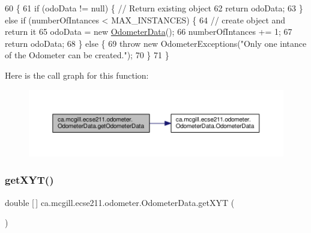 \begin{DoxyCode}
60                                                                                       \{
61     \textcolor{keywordflow}{if} (odoData != null) \{ \textcolor{comment}{// Return existing object}
62       \textcolor{keywordflow}{return} odoData;
63     \} \textcolor{keywordflow}{else} \textcolor{keywordflow}{if} (numberOfIntances < MAX\_INSTANCES) \{
64       \textcolor{comment}{// create object and return it}
65       odoData = \textcolor{keyword}{new} \hyperlink{classca_1_1mcgill_1_1ecse211_1_1odometer_1_1_odometer_data_a91412854b75c41bf3af7c8892ec0fe87}{OdometerData}();
66       numberOfIntances += 1;
67       \textcolor{keywordflow}{return} odoData;
68     \} \textcolor{keywordflow}{else} \{
69       \textcolor{keywordflow}{throw} \textcolor{keyword}{new} OdometerExceptions(\textcolor{stringliteral}{"Only one intance of the Odometer can be created."});
70     \}
71   \}
\end{DoxyCode}
Here is the call graph for this function\+:\nopagebreak
\begin{figure}[H]
\begin{center}
\leavevmode
\includegraphics[width=350pt]{classca_1_1mcgill_1_1ecse211_1_1odometer_1_1_odometer_data_afff2d760dd1f861b580f3eacef37f1cc_cgraph}
\end{center}
\end{figure}
\mbox{\label{classca_1_1mcgill_1_1ecse211_1_1odometer_1_1_odometer_data_a8f40f0264c68f0cbed4fff1723ae7863}} 
\subsubsection{\texorpdfstring{get\+X\+Y\+T()}{getXYT()}}
{\footnotesize\ttfamily double \mbox{[}$\,$\mbox{]} ca.\+mcgill.\+ecse211.\+odometer.\+Odometer\+Data.\+get\+X\+YT (\begin{DoxyParamCaption}{ }\end{DoxyParamCaption})}

